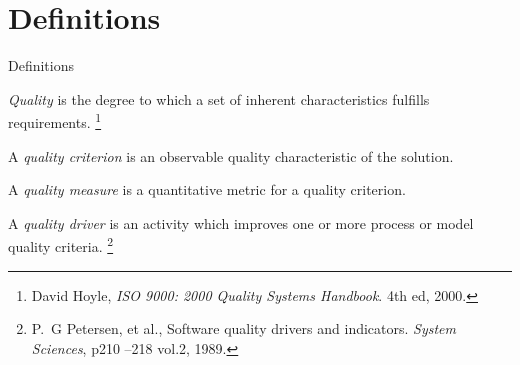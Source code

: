 \section{Definitions}

\begin{frame}{Definitions}

  \begin{definition}
   \emph{Quality} is the degree to which a set of inherent characteristics fulfills requirements.
	 \footnote{David Hoyle, {\em {ISO} 9000: 2000 Quality Systems Handbook}. 4th ed, 2000.}
  \end{definition}
  \pause

  \begin{definition}
   A \emph{quality criterion} is an observable quality characteristic of the solution.
  \end{definition}
  \pause 

  \begin{definition}
   A \emph{quality measure} is a quantitative metric for a quality criterion.
  \end{definition}
  \pause 

  \begin{definition}
	 	 A \emph{quality driver} is an activity which improves one or more process or model quality criteria.
	 \footnote{P.~G Petersen, et al., Software quality drivers and indicators. {\em System Sciences}, p210 --218 vol.2, 1989.}
  \end{definition}
\end{frame}